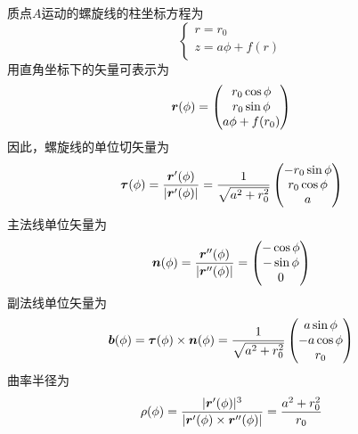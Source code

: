 \begin{solution}
质点$A$运动的螺旋线的柱坐标方程为
\begin{equation*}
\begin{cases}
	r = r_0 \\
	z = a\phi+f(r)
\end{cases}
\end{equation*}
用直角坐标下的矢量可表示为
\begin{equation*}
	\boldsymbol{r}(\phi) = \begin{pmatrix} r_0 \cos \phi \\ r_0 \sin \phi \\ a\phi + f(r_0) \end{pmatrix}
\end{equation*}
因此，螺旋线的单位切矢量为
\begin{equation*}
	\boldsymbol{\tau}(\phi) = \frac{\boldsymbol{r}'(\phi)}{|\boldsymbol{r}'(\phi)|} = \frac{1}{\sqrt{a^2+r_0^2}} \begin{pmatrix} -r_0 \sin \phi \\ r_0 \cos \phi \\ a \end{pmatrix}
\end{equation*}
主法线单位矢量为
\begin{equation*}
	\boldsymbol{n}(\phi) = \frac{\boldsymbol{r}''(\phi)}{|\boldsymbol{r}''(\phi)|} = \begin{pmatrix} -\cos \phi \\ -\sin \phi \\ 0 \end{pmatrix}
\end{equation*}
副法线单位矢量为
\begin{equation*}
	\boldsymbol{b}(\phi) = \boldsymbol{\tau}(\phi) \times \boldsymbol{n}(\phi) = \frac{1}{\sqrt{a^2+r_0^2}} \begin{pmatrix} a\sin \phi \\ -a\cos \phi \\ r_0 \end{pmatrix}
\end{equation*}
曲率半径为
\begin{equation*}
	\rho(\phi) = \frac{|\boldsymbol{r}'(\phi)|^3}{|\boldsymbol{r}'(\phi) \times \boldsymbol{r}''(\phi)|} = \frac{a^2+r_0^2}{r_0}
\end{equation*}


\end{solution}
